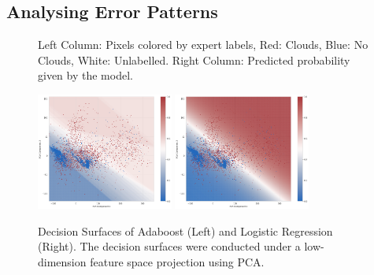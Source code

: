 \documentclass[11pt, letterpaper, journal]{IEEEtran}
\begin{document}
\subsection{Analysing Error Patterns}
\begin{figure}
    \centering
    \qquad
    \qquad
    \caption{Left Column: Pixels colored by expert labels, Red: Clouds, Blue: No Clouds, White: Unlabelled. Right Column: Predicted probability given by the model.}
    \label{fig:Probability_Preds}
\end{figure}

\begin{figure}[!h]
    \centering
    \includegraphics[width=0.4\textwidth]{statics/PCA_decision_surface_tr_23_te_1.png}
    \qquad
    \includegraphics[width=0.4\textwidth]{statics/log_reg_decision_surface_tr_23_te_1.png}
    \caption{Decision Surfaces of Adaboost (Left) and Logistic Regression (Right). The decision surfaces were conducted under a low-dimension feature space projection using PCA.}
    \label{fig:decision_surface}
\end{figure}
\end{document}
